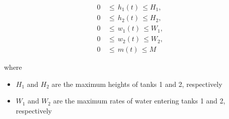 \begin{align}
    0 \, & \leq \, h_1 (t) \, \leq H_1, \\
    0 \, & \leq \, h_2 (t) \, \leq H_2, \\
    0 \, & \leq \, w_1 (t) \, \leq W_1, \\
    0 \, & \leq \, w_2 (t) \, \leq W_2, \\
    0 \, & \leq \, m (t) \, \leq M
\end{align}

where

\begin{itemize}
    \item $H_1$ and $H_2$ are the maximum heights of tanks 1 and 2, respectively
    \item $W_1$ and $W_2$ are the maximum rates of water entering tanks 1 and 2, respectively
\end{itemize}
